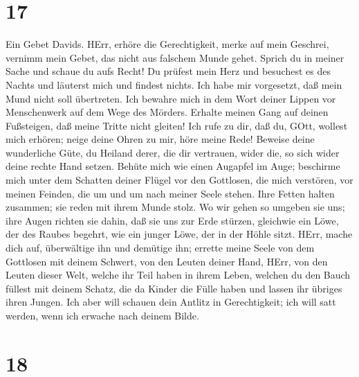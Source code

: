 \hypertarget{section-16}{%
\section{17}\label{section-16}}

 Ein Gebet Davids. HErr, erhöre die Gerechtigkeit, merke auf
mein Geschrei, vernimm mein Gebet, das nicht aus falschem Munde gehet.
 Sprich du in meiner Sache und schaue du aufs Recht!
 Du prüfest mein Herz und besuchest es des Nachts und
läuterst mich und findest nichts. Ich habe mir vorgesetzt, daß mein Mund
nicht soll übertreten.  Ich bewahre mich in dem Wort deiner
Lippen vor Menschenwerk auf dem Wege des Mörders.  Erhalte
meinen Gang auf deinen Fußsteigen, daß meine Tritte nicht gleiten!
 Ich rufe zu dir, daß du, GOtt, wollest mich erhören; neige
deine Ohren zu mir, höre meine Rede!  Beweise deine
wunderliche Güte, du Heiland derer, die dir vertrauen, wider die, so
sich wider deine rechte Hand setzen.  Behüte mich wie einen
Augapfel im Auge; beschirme mich unter dem Schatten deiner Flügel
 vor den Gottlosen, die mich verstören, vor meinen Feinden,
die um und um nach meiner Seele stehen.  Ihre Fetten halten
zusammen; sie reden mit ihrem Munde stolz.  Wo wir gehen so
umgeben sie uns; ihre Augen richten sie dahin, daß sie uns zur Erde
stürzen,  gleichwie ein Löwe, der des Raubes begehrt, wie
ein junger Löwe, der in der Höhle sitzt.  HErr, mache dich
auf, überwältige ihn und demütige ihn; errette meine Seele von dem
Gottlosen mit deinem Schwert,  von den Leuten deiner Hand,
HErr, von den Leuten dieser Welt, welche ihr Teil haben in ihrem Leben,
welchen du den Bauch füllest mit deinem Schatz, die da Kinder die Fülle
haben und lassen ihr übriges ihren Jungen.  Ich aber will
schauen dein Antlitz in Gerechtigkeit; ich will satt werden, wenn ich
erwache nach deinem Bilde.

\hypertarget{section-17}{%
\section{18}\label{section-17}}

